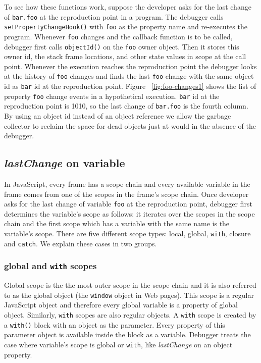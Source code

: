 \documentclass[preprint]{sigplanconf}
\begin{document}
To see how these functions work, suppose the developer asks for the
last change of \texttt{bar.foo} at the reproduction point in a
program. The debugger calls \texttt{setPropertyChangeHook()} with
\texttt{foo} as the property name and re-executes the
program. Whenever \texttt{foo} changes and the callback function is to
be called, debugger first calls \texttt{objectId()} on the
\texttt{foo} owner object. Then it stores this owner id, the stack
frame locations, and other state values in scope at the call point.
Whenever the execution reaches the reproduction point the debugger
looks at the history of \texttt{foo} changes and finds the last
\texttt{foo} change with the same object id as \texttt{bar} id at the
reproduction point. Figure ~\ref{fig:foo-changes1} shows the list of
property \texttt{foo} change events in a hypothetical
execution. \texttt{bar} id at the reproduction point is 1010, so the
last change of \texttt{bar.foo} is the fourth column.  By using an
object id instead of an object reference we allow the garbage
collector to reclaim the space for dead objects just at would in the
absence of the debugger.

\subsection{\textit{lastChange} on variable} 
In JavaScript, every frame has a scope chain and every available
variable in the frame comes from one of the scopes in the frame's
scope chain. Once developer asks for the last change of variable
\texttt{foo} at the reproduction point, debugger first determines the
variable's scope as follows: it iterates over the scopes in the scope
chain and the first scope which has a variable with the same name is
the variable's scope. There are five different scope types: local,
global, \texttt{with}, closure and \texttt{catch}. We explain these
cases in two groups.


\subsubsection{global and \texttt{with} scopes}
Global scope is the the most outer scope in the scope chain and it is
also referred to as the global object (the \texttt{window}
object in Web pages). This scope is a regular JavaScript object and therefore every
global variable is a property of global object. Similarly,
 \texttt{with} scopes are also regular objects. A \texttt{with}
scope is created by a \texttt{with()} block with an object as the
parameter. Every property of this parameter object is available inside the
block as a variable. Debugger treats the case where variable's scope
is global or \texttt{with}, like \textit{lastChange} on an object
property.
\end{document}
